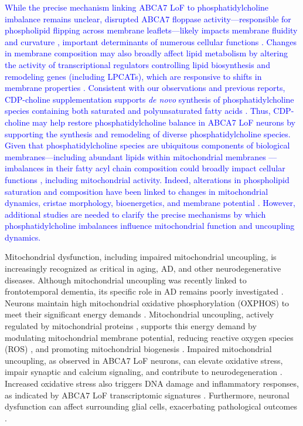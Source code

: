 \newcommand{\quoteI}{\textcolor{blue}{While the precise mechanism linking ABCA7 LoF to phosphatidylcholine imbalance remains unclear, disrupted ABCA7 floppase activity—responsible for phospholipid flipping across membrane leaflets—likely impacts membrane fluidity and curvature \cite{Takada2018-ce,Renne2018-fc}, important determinants of numerous cellular functions \cite{McMahon2015-gy,Yang2024-tz}. Changes in membrane composition may also broadly affect lipid metabolism by altering the activity of transcriptional regulators controlling lipid biosynthesis and remodeling genes (including LPCATs), which are responsive to shifts in membrane properties \cite{Ballweg2020-rv,Covino2018-hz}. Consistent with our observations and previous reports, CDP-choline supplementation supports \textit{de novo} synthesis of phosphatidylcholine species containing both saturated and polyunsaturated fatty acids \cite{Boumann2003-im}. Thus, CDP-choline may help restore phosphatidylcholine balance in ABCA7 LoF neurons by supporting the synthesis and remodeling of diverse phosphatidylcholine species. Given that phosphatidylcholine species are ubiquitous components of biological membranes—including abundant lipids within mitochondrial membranes \cite{Decker2024-ae}—imbalances in their fatty acyl chain composition could broadly impact cellular functions \cite{Wang2019-om,Van_der_Veen2017-ei}, including mitochondrial activity. Indeed, alterations in phospholipid saturation and composition have been linked to changes in mitochondrial dynamics, cristae morphology, bioenergetics, and membrane potential \cite{Decker2024-ae,Adachi2016-tg}. However, additional studies are needed to clarify the precise mechanisms by which phosphatidylcholine imbalances influence mitochondrial function and uncoupling dynamics.\label{quoteI-label}}} 
\quoteI

Mitochondrial dysfunction, including impaired mitochondrial uncoupling, is increasingly recognized as critical in aging, AD, and other neurodegenerative diseases. Although mitochondrial uncoupling was recently linked to frontotemporal dementia, its specific role in AD remains poorly investigated \cite{Bano2023-qz,Zong2024-tn,Demine2019-qj,Picca2023-gt}. Neurons maintain high mitochondrial oxidative phosphorylation (OXPHOS) to meet their significant energy demands \cite{Morant-Ferrando2023-va,Trigo2022-ym}. Mitochondrial uncoupling, actively regulated by mitochondrial proteins \cite{Park2023-fa,}, supports this energy demand by modulating mitochondrial membrane potential, reducing reactive oxygen species (ROS) \cite{Demine2019-qj,Shadel2015-kt}, and promoting mitochondrial biogenesis \cite{Korshunov1997-aj,Wisloff2005-ho,Andrews2005-yy,}. Impaired mitochondrial uncoupling, as observed in ABCA7 LoF neurons, can elevate oxidative stress, impair synaptic and calcium signaling, and contribute to neurodegeneration \cite{Korshunov1997-aj,Wisloff2005-ho,Andrews2005-yy,}. Increased oxidative stress also triggers DNA damage and inflammatory responses, as indicated by ABCA7 LoF transcriptomic signatures \cite{Robert2020-sc,Volanti2002-mc,Canty1999-oj,Schreck1992-zr}. Furthermore, neuronal dysfunction can affect surrounding glial cells, exacerbating pathological outcomes \cite{Byrns2024-id,Welch2022-ef}.


